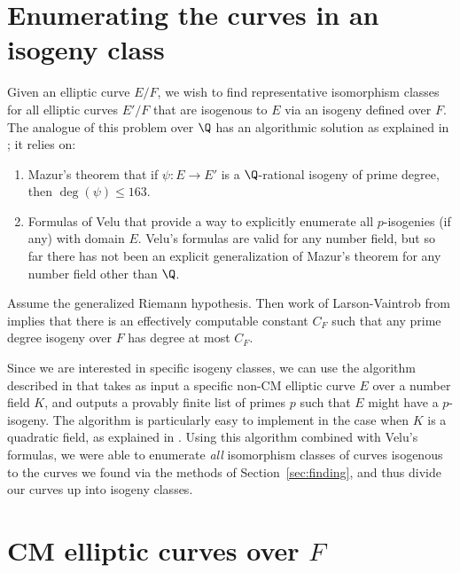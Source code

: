 \documentclass{amsart}
\begin{document}
\section{Enumerating the curves in an isogeny class}\label{sec:isoclass}

Given an elliptic curve $E/F$, we wish to find representative
isomorphism classes for all elliptic curves $E'/F$ that are isogenous
to $E$ via an isogeny defined over $F$. The analogue of this problem
over $\Q$ has an algorithmic solution as explained in
\cite[\S3.8]{cremona:algs}; it relies on:
\begin{enumerate}
\item  Mazur's theorem \cite{mazur:rational} 
that if $\psi:E\to E'$ is a $\Q$-rational isogeny of prime degree, 
then $\deg(\psi)\leq 163$.
\item Formulas of Velu \cite{velu:isogenies} 
that provide a way to explicitly enumerate all $p$-isogenies (if any) with domain $E$.  
Velu's formulas are valid for any number field, but so far there has not been an explicit
generalization of Mazur's theorem for any number field other than $\Q$. 
\end{enumerate}

\begin{remark}
  Assume the generalized Riemann hypothesis.  Then work of Larson-Vaintrob 
  from \cite{larson-vaintrob} implies that there is an effectively computable constant $C_F$ 
  such that any prime degree isogeny over $F$ has degree at most $C_F$.
\end{remark}

Since we are interested in specific isogeny classes, 
we can use the algorithm described in \cite{billerey:isog} that takes as
input a specific non-CM elliptic curve $E$ over a number field $K$, and
outputs a provably finite list of primes $p$ such that $E$ might have a
$p$-isogeny. The algorithm is particularly easy to implement in the
case when $K$ is a quadratic field, as explained in
\cite[\S2.3.4]{billerey:isog}.  Using this algorithm combined with
Velu's formulas, we were able to enumerate {\em all}
isomorphism classes of curves isogenous to the curves we found via the
methods of Section~\ref{sec:finding}, and thus divide our curves up into
isogeny classes.


\section{CM elliptic curves over $F$}\label{sec:cm}
\end{document}
